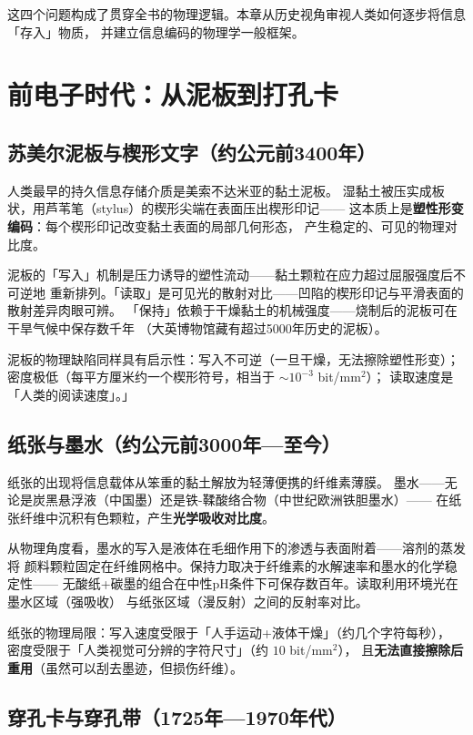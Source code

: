 \documentclass[11pt,a4paper,openany]{book}
\theoremstyle{definition}
\theoremstyle{plain}
\theoremstyle{remark}
\begin{document}
这四个问题构成了贯穿全书的物理逻辑。本章从历史视角审视人类如何逐步将信息「存入」物质，
并建立信息编码的物理学一般框架。

\section{前电子时代：从泥板到打孔卡}

\subsection{苏美尔泥板与楔形文字（约公元前3400年）}

人类最早的持久信息存储介质是美索不达米亚的黏土泥板。
湿黏土被压实成板状，用芦苇笔（stylus）的楔形尖端在表面压出楔形印记——
这本质上是\textbf{塑性形变编码}：每个楔形印记改变黏土表面的局部几何形态，
产生稳定的、可见的物理对比度。

泥板的「写入」机制是压力诱导的塑性流动——黏土颗粒在应力超过屈服强度后不可逆地
重新排列。「读取」是可见光的散射对比——凹陷的楔形印记与平滑表面的散射差异肉眼可辨。
「保持」依赖于干燥黏土的机械强度——烧制后的泥板可在干旱气候中保存数千年
（大英博物馆藏有超过5000年历史的泥板）。

泥板的物理缺陷同样具有启示性：写入不可逆（一旦干燥，无法擦除塑性形变）；
密度极低（每平方厘米约一个楔形符号，相当于 $\sim 10^{-3}$ bit/mm$^2$）；
读取速度是「人类的阅读速度」。」

\subsection{纸张与墨水（约公元前3000年—至今）}

纸张的出现将信息载体从笨重的黏土解放为轻薄便携的纤维素薄膜。
墨水——无论是炭黑悬浮液（中国墨）还是铁-鞣酸络合物（中世纪欧洲铁胆墨水）——
在纸张纤维中沉积有色颗粒，产生\textbf{光学吸收对比度}。

从物理角度看，墨水的写入是液体在毛细作用下的渗透与表面附着——溶剂的蒸发将
颜料颗粒固定在纤维网格中。保持力取决于纤维素的水解速率和墨水的化学稳定性——
无酸纸+碳墨的组合在中性pH条件下可保存数百年。读取利用环境光在墨水区域（强吸收）
与纸张区域（漫反射）之间的反射率对比。

纸张的物理局限：写入速度受限于「人手运动+液体干燥」（约几个字符每秒），
密度受限于「人类视觉可分辨的字符尺寸」（约 $10$ bit/mm$^2$），
且\textbf{无法直接擦除后重用}（虽然可以刮去墨迹，但损伤纤维）。

\subsection{穿孔卡与穿孔带（1725年—1970年代）}
\end{document}
